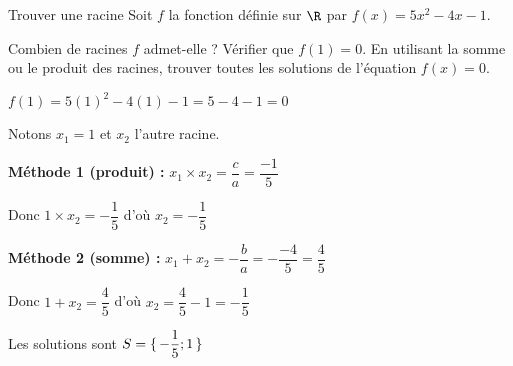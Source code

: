 \vspace{-1mm}
\def\rdifficulty{2}
\begin{EXO}{Trouver une racine}{}
Soit $f$ la fonction définie sur $\R$ par $f(x)=5x^2-4x-1$.
\begin{tcbenumerate}[2]
\tcbitem {} Combien de racines $f$ admet-elle ?
\tcbitem {} Vérifier que $f(1)=0$.
\tcbitem[raster multicolumn=2]  En utilisant la somme ou le produit des racines, trouver toutes les solutions de l'équation $f(x)=0$.
\end{tcbenumerate}

\exocorrection

\begin{tcbenumerate}[1]
\tcbitem {}

\tcbitem $f(1) = 5(1)^2 - 4(1) - 1 = 5 - 4 - 1 = 0$ \checkmark

\tcbitem Notons $x_1 = 1$ et $x_2$ l'autre racine.

\textbf{Méthode 1 (produit) :} $x_1 \times x_2 = \dfrac{c}{a} = \dfrac{-1}{5}$

Donc $1 \times x_2 = -\dfrac{1}{5}$ d'où $x_2 = -\dfrac{1}{5}$

\textbf{Méthode 2 (somme) :} $x_1 + x_2 = -\dfrac{b}{a} = -\dfrac{-4}{5} = \dfrac{4}{5}$

Donc $1 + x_2 = \dfrac{4}{5}$ d'où $x_2 = \dfrac{4}{5} - 1 = -\dfrac{1}{5}$

Les solutions sont $S = \ensembleDiscret{-\dfrac{1}{5} ; 1}$
\end{tcbenumerate}
\end{EXO}

\vspace{-1mm}

